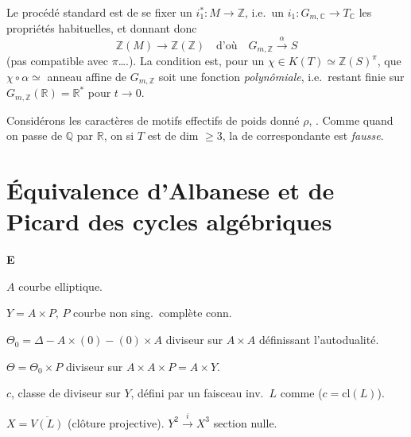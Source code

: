 \documentclass[11pt,a4paper]{article}
\begin{document}
Le procédé standard est de se fixer un $i_{1}^{*} : M \to \mathbb{Z}$,
i.e.\ un $i_{1} : G_{m,\mathbb{C}} \to T_{\mathbb{C}}$ \ill{} les propriétés
habituelles, et donnant donc
\[
  \mathbb{Z}(M) \to \mathbb{Z}(\mathbb{Z})
  \quad \text{d'où} \quad
  G_{m,\mathbb{Z}} \xrightarrow{\ \alpha\ } S
\]
(pas compatible avec $\pi$….). La condition est, \struck{\ill{}} pour un
$\chi \in K(T) \simeq \mathbb{Z}(S)^{\pi}$, que $\chi \circ \alpha \simeq$
\ill{} anneau affine de $G_{m,\mathbb{Z}}$ soit une fonction
\emph{polynômiale}, i.e.\ restant finie sur
$G_{m,\mathbb{Z}}(\mathbb{R}) = \mathbb{R}^{*}$ pour $t \to 0$.

Considérons les caractères de motifs effectifs de poids donné $\rho$,
\ill{}  \ill{} . Comme \struck{\ill{}} \struck{\ill{}} \ill{} \ill{} quand on passe
de $\mathbb{Q}$ par $\mathbb{R}$,  on \ill{} si $T$ est de
dim $\geq 3$, la  de 
correspondante est \emph{fausse}.

\section{Équivalence d'Albanese et de Picard des cycles algébriques}


\textbf{E}

$A$ courbe elliptique.

$Y = A \times P$, $P$ courbe non sing.\ complète conn.

$\Theta_{0} = \Delta - A \times (0) - (0) \times A$ \struck{\ill{}} diviseur
 sur $A \times A$ définissant l'autodualité.

$\Theta = \Theta_{0} \times P$ diviseur  sur
$A \times A \times P = A \times Y$.

$c$, classe de diviseur sur $Y$, défini par un  faisceau
inv.\ $L$ comme ($c = \mathrm{cl}(L)$).

$X = \overline{V(L)}$ (clôture projective). $Y^{2} \xrightarrow{\ i\ }
X^{3}$ section nulle.
\end{document}
